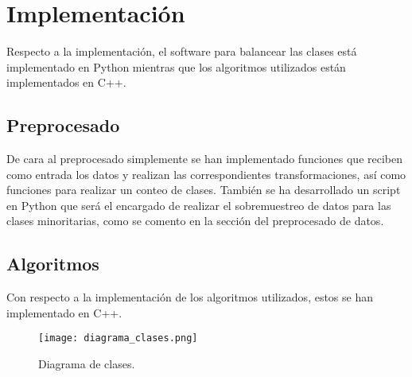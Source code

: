 \section{Implementación}

Respecto a la implementación, el software para balancear las clases está implementado en Python mientras que los algoritmos utilizados están implementados en C++.

\subsection{Preprocesado}

De cara al preprocesado simplemente se han implementado funciones que reciben como entrada los datos y realizan las correspondientes transformaciones, así como funciones para realizar un conteo de clases. También se ha desarrollado un script en Python que será el encargado de realizar el sobremuestreo de datos para las clases minoritarias, como se comento en la sección del preprocesado de datos.

\subsection{Algoritmos}

Con respecto a la implementación de los algoritmos utilizados, estos se han implementado en C++.

\begin{figure}[H]
	 \centering
	 \texttt{[image: diagrama\_clases.png]}
	 \caption{Diagrama de clases.}
	\label{fig:diagrama_clases}
\end{figure}
